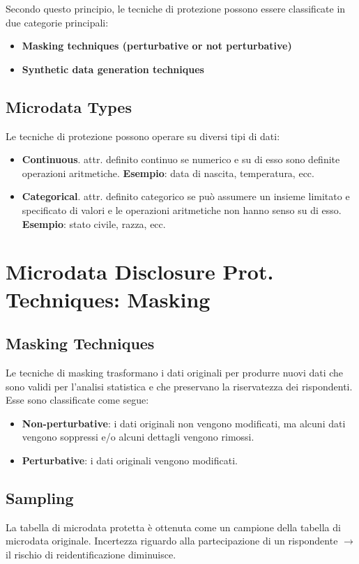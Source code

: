 \documentclass{report}
\begin{document}
\noindent Secondo questo principio, le tecniche di protezione possono essere classificate in due categorie principali:
\begin{itemize}
    \item \textbf{Masking techniques (perturbative or not perturbative)}
    \item \textbf{Synthetic data generation techniques}
\end{itemize}

\subsection{Microdata Types}
Le tecniche di protezione possono operare su diversi tipi di dati:
\begin{itemize}
    \item \textbf{Continuous}. attr. definito continuo se numerico e su di esso sono definite operazioni aritmetiche.
    \textbf{Esempio}: data di nascita, temperatura, ecc.
    
    \item \textbf{Categorical}. attr. definito categorico se può assumere un insieme limitato e specificato di valori e le operazioni aritmetiche non hanno senso su di esso.
    \textbf{Esempio}: stato civile, razza, ecc.
\end{itemize}


\section{Microdata Disclosure Prot. Techniques: Masking}

\subsection{Masking Techniques}
Le tecniche di masking trasformano i dati originali per produrre nuovi dati che sono validi per l'analisi statistica e che preservano la riservatezza dei rispondenti. Esse sono classificate come segue:
\begin{itemize}
    \item \textbf{Non-perturbative}: i dati originali non vengono modificati, ma alcuni dati vengono soppressi e/o alcuni dettagli vengono rimossi.
    \item \textbf{Perturbative}: i dati originali vengono modificati.
\end{itemize}

\subsection{Sampling}
La tabella di microdata protetta è ottenuta come un campione della tabella di microdata originale. 
Incertezza riguardo alla partecipazione di un rispondente $\rightarrow$ il rischio di reidentificazione diminuisce.
\end{document}
